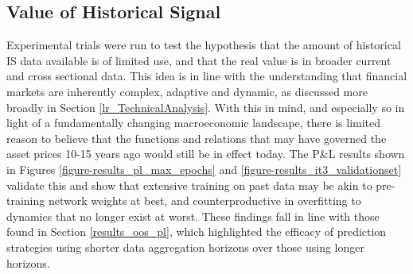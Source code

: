 \documentclass[a4paper,11pt,oneside]{article}
\theoremstyle{plain}
\theoremstyle{definition}
\begin{document}
\begin{figure}[H]
			\label{figure_ogdlr_delta_encoding_groups}
		\end{figure}
		
		
		
		
		\newpage

	\subsection{Value of Historical Signal}\label{results_data_hist}
		
	Experimental trials were run to test the hypothesis that the amount of historical IS data available is of limited use, and that the real value is in broader current and cross sectional data. This idea is in line with the understanding that financial markets are inherently complex, adaptive and dynamic, as discussed more broadly in Section \ref{lr_TechnicalAnalysis}. With this in mind, and especially so in light of a fundamentally changing macroeconomic landscape, there is limited reason to believe that the functions and relations that may have governed the asset prices 10-15 years ago would still be in effect today. The P\&L results shown in Figures \ref{figure-results_pl_max_epochs} and \ref{figure-results_it3_validationset} validate this and show that extensive training on past data may be akin to pre-training network weights at best, and counterproductive in overfitting to dynamics that no longer exist at worst. These findings fall in line with those found in Section \ref{results_oos_pl}, which highlighted the efficacy of prediction strategies using shorter data aggregation horizons over those using longer horizons.
	
\end{document}
